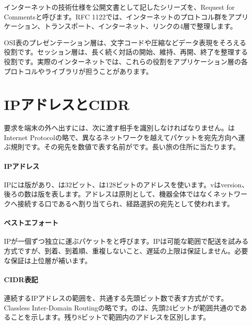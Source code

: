     インターネットの技術仕様を公開文書として記したシリーズを、Request for Commentsと呼びます。RFC 1122では、インターネットのプロトコル群をアプリケーション、トランスポート、インターネット、リンクの4層で整理します。

    OSI表のプレゼンテーション層は、文字コードや圧縮などデータ表現をそろえる役割です。セッション層は、長く続く対話の開始、維持、再開、終了を整理する役割です。実際のインターネットでは、これらの役割をアプリケーション層の各プロトコルやライブラリが担うことがあります。

\par
\endgroup


\section{IPアドレスとCIDR}
\label{sec:05-network-06}

要求を端末の外へ出すには、次に渡す相手を識別しなければなりません。はInternet Protocolの略で、異なるネットワークを越えてパケットを宛先方向へ運ぶ規則です。その宛先を数値で表す名前がです。長い旅の住所に当たります。

\begingroup
\begingroup
\paragraph{IPアドレス}
        IPには版があり、は32ビット、は128ビットのアドレスを使います。vはversion、後ろの数は版を表します。アドレスは原則として、機器全体ではなくネットワークへ接続する口であるへ割り当てられ、経路選択の宛先として使われます。

\paragraph{ベストエフォート}
        IPが一個ずつ独立に運ぶパケットをと呼びます。IPは可能な範囲で配送を試みる方式ですが、到着、到着順、重複しないこと、遅延の上限は保証しません。必要な保証は上位層が補います。

\par
\endgroup
\medskip
\begingroup
\paragraph{CIDR表記}
        連続するIPアドレスの範囲を、共通する先頭ビット数で表す方式がです。Classless Inter-Domain Routingの略です。のは、先頭24ビットが範囲共通のであることを示します。残り8ビットで範囲内のアドレスを区別します。

